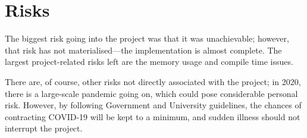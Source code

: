 \documentclass[12pt, a4paper, bibliography=totocnumbered]{scrartcl}
\begin{document}
\section{Risks}

The biggest risk going into the project was that it was unachievable; however, that risk has not materialised---the implementation is almost complete. The largest project-related risks left are the memory usage and compile time issues. 

There are, of course, other risks not directly associated with the project; in 2020, there is a large-scale pandemic going on, which could pose considerable personal risk. However, by following Government and University guidelines, the chances of contracting COVID-19 will be kept to a minimum, and sudden illness should not interrupt the project.






\end{document}
